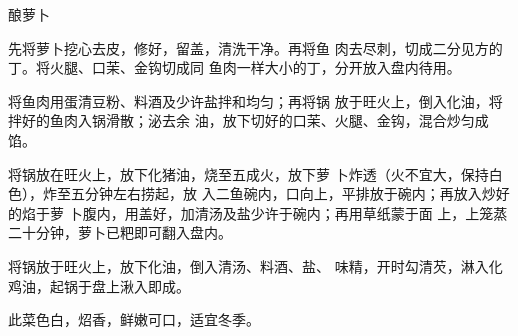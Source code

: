 \begin{recipe}{酿萝卜}

\ingredients



\cooking

\step 先将萝卜挖心去皮，修好，留盖，清洗干净。再将鱼 肉去尽刺，切成二分见方的丁。将火腿、口茉、金钩切成同 鱼肉一样大小的丁，分开放入盘内待用。

\step 将鱼肉用蛋清豆粉、料酒及少许盐拌和均匀；再将锅 放于旺火上，倒入化油，将拌好的鱼肉入锅滑散；泌去余 油，放下切好的口茉、火腿、金钩，混合炒匀成馅。

\step 将锅放在旺火上，放下化猪油，烧至五成火，放下萝 卜炸透（火不宜大，保持白色），炸至五分钟左右捞起，放 入二鱼碗内，口向上，平排放于碗内；再放入炒好的焰于萝 卜腹内，用盖好，加清汤及盐少许于碗内；再用草纸蒙于面 上，上笼蒸二十分钟，萝卜已粑即可翻入盘内。

\step 将锅放于旺火上，放下化油，倒入清汤、料酒、盐、 味精，开时勾清芡，淋入化鸡油，起锅于盘上湫入即成。

\notes

此菜色白，炤香，鲜嫩可口，适宜冬季。

\end{recipe}

